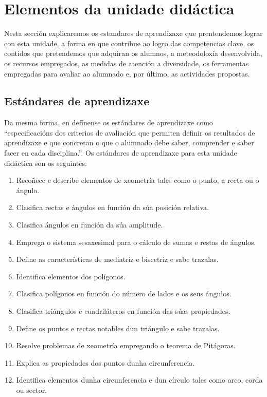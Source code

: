 \section{Elementos da unidade didáctica}
Nesta sección explicaremos os estandares de aprendizaxe que prentendemos lograr con esta unidade, a forma en que contribue ao logro das competencias clave, os contidos que pretendemos que adquiran os alumnos, a meteodoloxía desenvolvida, os recursos empregados, as medidas de atención a diversidade, os ferramentas empregadas para avaliar ao alumnado e, por último, as actividades propostas.

\subsection{Estándares de aprendizaxe}
Da mesma forma, en \cite{dogcurrlomce} defínense os estándares de aprendizaxe como ``especificacións dos criterios de avaliación que permiten definir os resultados de aprendizaxe e que concretan o que o alumnado debe saber, comprender e saber facer en cada disciplina.''.  Os estándares de aprendizaxe para esta unidade didáctica son os seguintes:

\begin{enumerate}[label=\bfseries Est\arabic*]
 \item\label{est1} Recoñece e describe elementos de xeometría tales como o punto, a recta ou o ángulo.
 \item\label{est2} Clasifica rectas e ángulos en función da súa posición relativa.
 \item\label{est3} Clasifica ángulos en función da súa amplitude.
 \item\label{est4} Emprega o sistema sesaxesimal para o cálculo de sumas e restas de ángulos.
 \item\label{est5} Define as características de mediatriz e bisectriz e sabe trazalas.
 \item\label{est6} Identifica elementos dos polígonos.
 \item\label{est7} Clasifica polígonos en función do número de lados e os seus ángulos.
 \item\label{est8} Clasifica triángulos e cuadriláteros en función das súas propiedades.
 \item\label{est9} Define os puntos e rectas notables dun triángulo e sabe trazalas.
 \item\label{est10} Resolve problemas de xeometría empregando o teorema de Pitágoras.
 \item\label{est11} Explica as propiedades dos puntos dunha circunferencia.
 \item\label{est12} Identifica elementos dunha circunferencia e dun círculo tales como arco, corda ou sector.
\end{enumerate}

